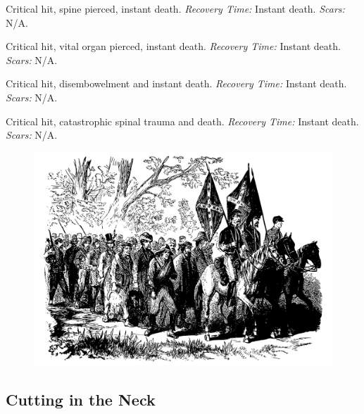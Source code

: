 \documentclass[12pt]{book}
\begin{document}
\begin{description}[labelwidth=1.5em, leftmargin=*, itemsep=0.4em]
    \item[17 -] Critical hit, spine pierced, instant death. \textit{Recovery Time:} Instant death. \textit{Scars:} N/A.
    \item[18 -] Critical hit, vital organ pierced, instant death. \textit{Recovery Time:} Instant death. \textit{Scars:} N/A.
    \item[19 -] Critical hit, disembowelment and instant death. \textit{Recovery Time:} Instant death. \textit{Scars:} N/A.
    \item[20 -] Critical hit, catastrophic spinal trauma and death. \textit{Recovery Time:} Instant death. \textit{Scars:} N/A.
\end{description}

\begin{figure}[h]
    \centering
    \includegraphics[width=\textwidth]{./images/combat08.pdf}
\end{figure}

\subsection{Cutting in the Neck}
\end{document}
